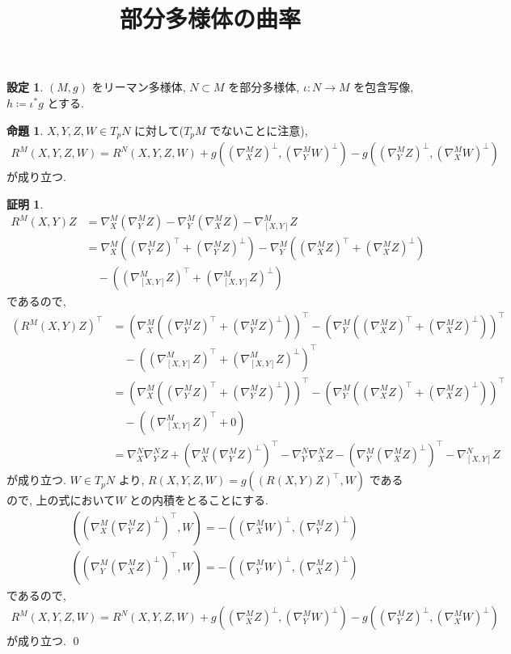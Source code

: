 \documentclass[10pt, fleqn, label-section=none]{bxjsarticle}
\title{部分多様体の曲率}
\date{}
\author{}
\theoremstyle{definition}
\newtheorem{prop}[dfn]{命題}
\newtheorem{setting}[dfn]{設定}
\newtheorem*{pf*}{証明}
\renewcommand{\;}{\, ; \,}
\begin{document}
\maketitle

\section{}

\begin{setting}
$(M, g)$ をリーマン多様体, $N \subset M$ を部分多様体, $\iota: N \rightarrow M$ を包含写像, $h \coloneqq \iota^* g$ とする.   
\end{setting}

\begin{prop}$X, Y, Z, W \in T_p N$ に対して($T_p M$ でないことに注意), 
\begin{align*} R^M (X, Y, Z, W) = R^N (X, Y, Z, W) + g((\nabla^M_X Z)^\perp, (\nabla^M_Y W)^\perp ) - g((\nabla^M_Y Z)^\perp , (\nabla^M_X W)^\perp )  \end{align*}
が成り立つ. 
\end{prop}
\begin{pf*}
\begin{align*} R^M(X, Y)Z &= \nabla^M_X (\nabla^M_Y Z) - \nabla^M_Y (\nabla^M_X Z) - \nabla^M_{[X, Y]} Z 
\\&=   \nabla^M_X (  (\nabla^M_Y Z)^\top + (\nabla^M_Y Z)^\perp   ) - \nabla^M_Y ((\nabla^M_X Z)^\top + (\nabla^M_X Z) ^\perp ) \\& \quad - ((\nabla^M_{[X, Y]} Z) ^\top + (\nabla^M_{[X, Y]} Z) ^\perp)
 \end{align*}
 であるので, 
 \begin{align*} (R^M(X, Y)Z)^\top &=  (\nabla^M_X (  (\nabla^M_Y Z)^\top + (\nabla^M_Y Z)^\perp   ))^\top - (\nabla^M_Y ((\nabla^M_X Z)^\top + (\nabla^M_X Z) ^\perp ))^\top \\& \quad - ((\nabla^M_{[X, Y]} Z) ^\top + (\nabla^M_{[X, Y]} Z) ^\perp)^\top 
 \\&=  (\nabla^M_X (  (\nabla^M_Y Z)^\top + (\nabla^M_Y Z)^\perp   ))^\top - (\nabla^M_Y ((\nabla^M_X Z)^\top + (\nabla^M_X Z) ^\perp ))^\top \\& \quad - ((\nabla^M_{[X, Y]} Z) ^\top + 0) 
 \\&=  \nabla^N_X \nabla^N_Y Z + (\nabla^M_X (\nabla^M _Y Z) ^\perp )^\top  - \nabla^N_Y \nabla^N_X Z - (\nabla^M_Y (\nabla^M _X Z) ^\perp )^\top - \nabla^N_{[X, Y]} Z    \end{align*}
 が成り立つ. $W \in T_p N$ より, $R(X, Y, Z, W) = g((R(X, Y)Z )^\top, W)$ であるので, 上の式において$W$ との内積をとることにする.
\begin{align*} &((\nabla^M_X (\nabla^M _Y Z )^\perp )^\top , W) = - ( (\nabla^M_X W)^\perp , (\nabla^M _Y Z )^\perp)   
\\& ((\nabla^M_Y (\nabla^M _X Z) ^\perp )^\top, W) = -  ( (\nabla^M_Y W)^\perp , (\nabla^M _X Z )^\perp)   \end{align*}
であるので, 
\begin{align*} R^M (X, Y, Z, W) = R^N (X, Y, Z, W) + g((\nabla^M_X Z)^\perp, (\nabla^M_Y W)^\perp ) - g((\nabla^M_Y Z)^\perp , (\nabla^M_X W)^\perp )  \end{align*}
が成り立つ. 
\qed
\end{pf*}
\end{document}
